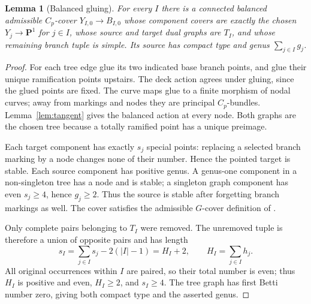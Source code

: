 \documentclass[11pt]{article}
\newtheorem{lemma}[theorem]{Lemma}
\theoremstyle{definition}
\begin{document}
\begin{lemma}[Balanced gluing]\label{lem:glue}
For every $I$ there is a connected balanced admissible $C_p$-cover
$Y_{I,0}\to B_{I,0}$ whose component covers are exactly the chosen
$Y_j\to\mathbf P^1$ for $j\in I$, whose source and target dual graphs are
$T_I$, and whose remaining branch tuple is simple. Its source has compact
type and genus $\sum_{j\in I}g_j$.
\end{lemma}
\begin{proof}
For each tree edge glue its two indicated base branch points, and glue their
unique ramification points upstairs. The deck action agrees under gluing,
since the glued points are fixed. The curve maps glue to a finite morphism
of nodal curves; away from markings and nodes they are principal $C_p$-bundles.
Lemma~\ref{lem:tangent} gives the balanced action at every node. Both graphs
are the chosen tree because a totally ramified point has a unique preimage.

Each target component has exactly $s_j$ special points: replacing a selected
branch marking by a node changes none of their number. Hence the pointed
target is stable. Each source component has positive genus. A genus-one
component in a non-singleton tree has a node and is stable; a singleton graph
component has even $s_j\geq4$, hence $g_j\geq2$. Thus the source is stable
after forgetting branch markings as well. The cover satisfies the admissible
$G$-cover definition of \cite[Definition 4.3.1]{ACV}.

Only complete pairs belonging to $T_I$ were removed. The unremoved tuple is
therefore a union of opposite pairs and has length
\begin{equation}\label{eq:counts}
 s_I=\sum_{j\in I}s_j-2(|I|-1)=H_I+2,\qquad
 H_I=\sum_{j\in I}h_j.
\end{equation}
All original occurrences within $I$ are paired, so their total number is even;
thus $H_I$ is positive and even, $H_I\geq2$, and $s_I\geq4$. The tree graph
has first Betti number zero, giving both compact type and the asserted genus.
\end{proof}
\end{document}
